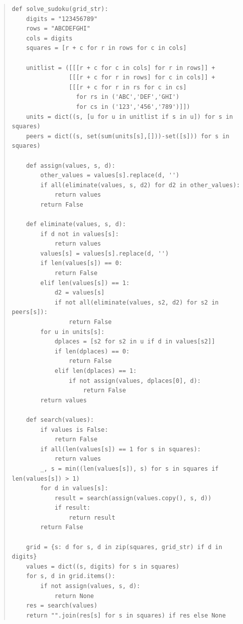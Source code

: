 \documentclass{article} %
\begin{document}
\begin{quote}
\begin{verbatim}
def solve_sudoku(grid_str):
    digits = "123456789"
    rows = "ABCDEFGHI"
    cols = digits
    squares = [r + c for r in rows for c in cols]
    
    unitlist = ([[[r + c for c in cols] for r in rows]] +
                [[[r + c for r in rows] for c in cols]] +
                [[[r + c for r in rs for c in cs]
                  for rs in ('ABC','DEF','GHI')
                  for cs in ('123','456','789')]])
    units = dict((s, [u for u in unitlist if s in u]) for s in squares)
    peers = dict((s, set(sum(units[s],[]))-set([s])) for s in squares)
    
    def assign(values, s, d):
        other_values = values[s].replace(d, '')
        if all(eliminate(values, s, d2) for d2 in other_values):
            return values
        return False

    def eliminate(values, s, d):
        if d not in values[s]:
            return values
        values[s] = values[s].replace(d, '')
        if len(values[s]) == 0:
            return False
        elif len(values[s]) == 1:
            d2 = values[s]
            if not all(eliminate(values, s2, d2) for s2 in peers[s]):
                return False
        for u in units[s]:
            dplaces = [s2 for s2 in u if d in values[s2]]
            if len(dplaces) == 0:
                return False
            elif len(dplaces) == 1:
                if not assign(values, dplaces[0], d):
                    return False
        return values

    def search(values):
        if values is False:
            return False
        if all(len(values[s]) == 1 for s in squares):
            return values
        _, s = min((len(values[s]), s) for s in squares if len(values[s]) > 1)
        for d in values[s]:
            result = search(assign(values.copy(), s, d))
            if result:
                return result
        return False

    grid = {s: d for s, d in zip(squares, grid_str) if d in digits}
    values = dict((s, digits) for s in squares)
    for s, d in grid.items():
        if not assign(values, s, d):
            return None
    res = search(values)
    return "".join(res[s] for s in squares) if res else None
\end{verbatim}
\end{quote}
\end{document}
